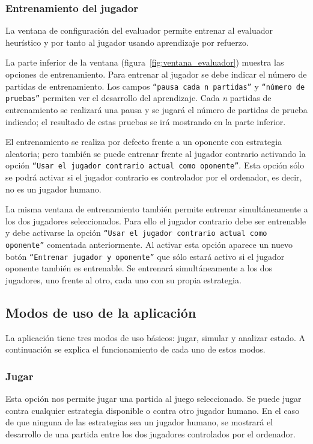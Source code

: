 \subsubsection{Entrenamiento del jugador}
\label{sssec:entrenamiento_jugador}
La ventana de configuración del evaluador permite entrenar al evaluador heurístico y por tanto al jugador usando aprendizaje por refuerzo.

La parte inferior de la ventana (figura~\ref{fig:ventana_evaluador}) muestra las opciones de entrenamiento.
Para entrenar al jugador se debe indicar el número de partidas de entrenamiento.
Los campos \texttt{``pausa cada \textit{n} partidas''} y \texttt{``número de pruebas''} permiten ver el desarrollo del aprendizaje.
Cada \textit{n} partidas de entrenamiento se realizará una pausa y se jugará el número de partidas de prueba indicado; el resultado de estas pruebas se irá mostrando en la parte inferior.

El entrenamiento se realiza por defecto frente a un oponente con estrategia aleatoria; pero también se puede entrenar frente al jugador contrario activando la opción \texttt{``Usar el jugador contrario actual como oponente''}.
Esta opción sólo se podrá activar si el jugador contrario es controlador por el ordenador, es decir, no es un jugador humano.

La misma ventana de entrenamiento también permite entrenar simultáneamente a los dos jugadores seleccionados.
Para ello el jugador contrario debe ser entrenable y debe activarse la opción \texttt{``Usar el jugador contrario actual como oponente''} comentada anteriormente.
Al activar esta opción aparece un nuevo botón \texttt{``Entrenar jugador y oponente''} que sólo estará activo si el jugador oponente también es entrenable.
Se entrenará simultáneamente a los dos jugadores, uno frente al otro, cada uno con su propia estrategia.

\subsection{Modos de uso de la aplicación}
\label{ssec:funcionalidad}
La aplicación tiene tres modos de uso básicos: jugar, simular y analizar estado.
A continuación se explica el funcionamiento de cada uno de estos modos.

\subsubsection{Jugar}
\label{sssec:jugar}
Esta opción nos permite jugar una partida al juego seleccionado.
Se puede jugar contra cualquier estrategia disponible o contra otro jugador humano.
En el caso de que ninguna de las estrategias sea un jugador humano, se mostrará el desarrollo de una partida entre los dos jugadores controlados por el ordenador.

